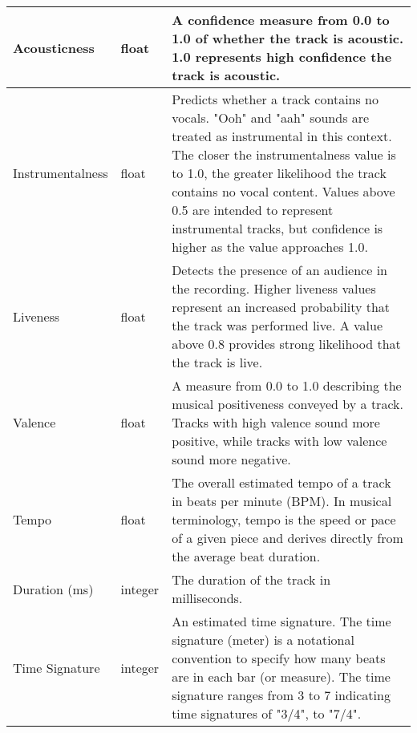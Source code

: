 \begin{table}[ht]
{\begin{tabular}{|>{\raggedright\arraybackslash}p{}|>{\raggedright\arraybackslash}p{}|>{\raggedright\arraybackslash}p{}|}
    \hline
    Acousticness & float & A confidence measure from 0.0 to 1.0 of whether the track is acoustic. 1.0 represents high confidence the track is acoustic. \\
    \hline
    Instrumentalness & float & Predicts whether a track contains no vocals. "Ooh" and "aah" sounds are treated as instrumental in this context. The closer the instrumentalness value is to 1.0, the greater likelihood the track contains no vocal content. Values above 0.5 are intended to represent instrumental tracks, but confidence is higher as the value approaches 1.0. \\
    \hline
    Liveness & float & Detects the presence of an audience in the recording. Higher liveness values represent an increased probability that the track was performed live. A value above 0.8 provides strong likelihood that the track is live. \\
    \hline
    Valence & float & A measure from 0.0 to 1.0 describing the musical positiveness conveyed by a track. Tracks with high valence sound more positive, while tracks with low valence sound more negative. \\
    \hline
    Tempo & float & The overall estimated tempo of a track in beats per minute (BPM). In musical terminology, tempo is the speed or pace of a given piece and derives directly from the average beat duration. \\
    \hline
    Duration (ms) & integer & The duration of the track in milliseconds. \\
    \hline
    Time Signature & integer & An estimated time signature. The time signature (meter) is a notational convention to specify how many beats are in each bar (or measure). The time signature ranges from 3 to 7 indicating time signatures of "3/4", to "7/4". \\
    \hline  
    \end{tabular}
    }
\end{table}